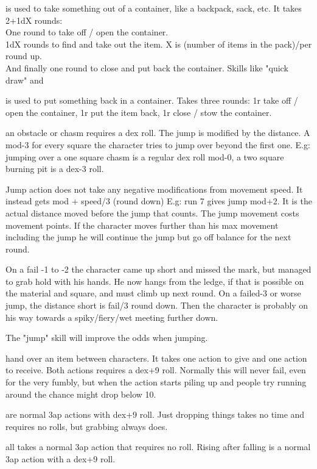  is used to take something out of a container, like a backpack, sack, etc. It takes 2+1dX rounds: \\
One round to take off / open the container. \\
1dX rounds to find and take out the item. X is (number of items in the pack)/per round up. \\
And finally one round to close and put back the container.
Skills like "quick draw" and


 is used to put something back in a container. Takes three rounds: 1r take off / open the container, 1r put the item back, 1r close / stow the container.


 an obstacle or chasm requires a dex roll.
The jump is modified by the distance. A mod-3 for every square the character tries to jump over beyond the first one. E.g: jumping over a one square chasm is a regular dex roll mod-0, a two square burning pit is a dex-3 roll.

Jump action does not take any negative modifications from movement speed. It instead gets mod + speed/3 (round down) E.g: run 7 gives jump mod+2. It is the actual distance moved before the jump that counts. The jump movement costs movement points. If the character moves further than his max movement including the jump he will continue the jump but go off balance for the next round.

On a fail -1 to -2 the character came up short and missed the mark, but managed to grab hold with his hands. He now hangs from the ledge, if that is possible on the material and square, and must climb up next round. On a failed-3 or worse jump, the distance short is fail/3 round down. Then the character is probably on his way towards a spiky/fiery/wet meeting further down.

The "jump" skill will improve the odds when jumping.


 hand over an item between characters. It takes one action to give and one action to receive. Both actions requires a dex+9 roll. Normally this will never fail, even for the very fumbly, but when the action starts piling up and people try running around the chance might drop below 10.


 are normal 3ap actions with dex+9 roll. Just dropping things takes no time and requires no rolls, but grabbing always does.


 all takes a normal 3ap action that requires no roll. Rising after falling is a normal 3ap action with a dex+9 roll.


